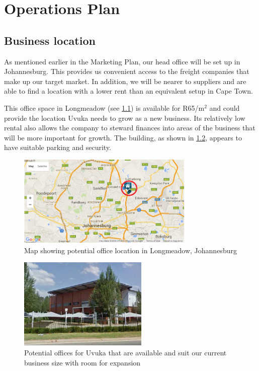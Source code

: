 \newpage

\chapter{Operations Plan}
\section{Business location}
As mentioned earlier in the Marketing Plan, our head office will be set up in Johannesburg. This provides us convenient access to the freight companies that make up our target market. In addition, we will be nearer to suppliers and are able to find a location with a lower rent than an equivalent setup in Cape Town.

This office space in Longmeadow (see \cref{fig:map}) is available for R65/m$^2$ and could provide the location Uvuka needs to grow as a new business. Its relatively low rental also allows the company to steward finances into areas of the business that will be more important for growth. The building, as shown in \cref{fig:offices}, appears to have suitable parking and security.

\begin{figure}[H]
\centering
\includegraphics[width=0.75\textwidth]{images/offices_map.PNG}
\vskip10pt
\caption[Map showing potential office location in Longmeadow, north of Johannesburg]{Map showing potential office location in Longmeadow, Johannesburg}
\label{fig:map}
\end{figure}

\begin{figure}[H]
\centering
\includegraphics[width=0.55\textwidth]{images/offices_building.PNG}
\vskip10pt
\caption[Potential offices for Uvuka]{Potential offices for Uvuka that are available and suit our current business size with room for expansion}
\label{fig:offices}
\end{figure}


